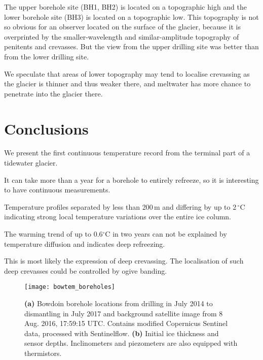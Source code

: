 \documentclass[utf8]{article}
\begin{document}
    The upper borehole site (BH1, BH2) is located on a topographic high and the
    lower borehole site (BH3) is located on a topographic low. This topography
    is not so obvious for an observer located on the surface of the glacier,
    because it is overprinted by the smaller-wavelength and similar-amplitude
    topography of penitents and crevasses. But the view from the upper drilling
    site was better than from the lower drilling site.

    We speculate that areas of lower topography may tend to localise crevassing
    as the glacier is thinner and thus weaker there, and meltwater has more
    chance to penetrate into the glacier there.

\section{Conclusions}

    We present the first continuous temperature record from the terminal part
    of a tidewater glacier.

    It can take more than a year for a borehole to entirely refreeze, so it is
    interesting to have continuous measurements.

    Temperature profiles separated by less than 200\,m and differing by up to
    2\,$^\circ$C indicating strong local temperature variations over the
    entire ice column.

    The warming trend of up to 0.6$^\circ$C in two years can not be explained
    by temperature diffusion and indicates deep refreezing.

    This is most likely the expression of deep crevassing. The localisation of
    such deep crevasses could be controlled by ogive banding.


\clearpage

    \begin{figure}
      \centerline{\texttt{[image: bowtem\_boreholes]}}
      \caption{\textbf{(a)} Bowdoin borehole locations from drilling in July
               2014 to dismantling in July 2017 and background satellite
               image from 8 Aug. 2016, 17:59:15 UTC. Contains modified
               Copernicus Sentinel data, processed with Sentinelflow.
               \textbf{(b)} Initial ice thickness and sensor depths.
               Inclinometers and piezometers are also equipped with
               thermistors.}
      \label{fig:boreholes}
    \end{figure}
\end{document}

